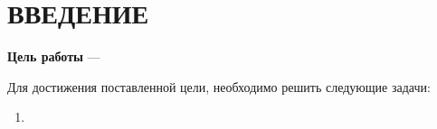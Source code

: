 \section*{\large ВВЕДЕНИЕ}



\textbf{Цель работы} --- 


Для достижения поставленной цели, необходимо решить следующие задачи:
\begin{enumerate}
    \item 
\end{enumerate}